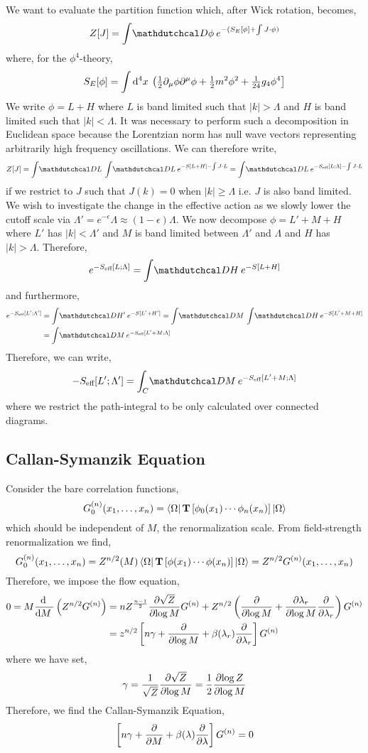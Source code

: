 \documentclass[12pt]{extarticle}
\begin{document}
We want to evaluate the partition function which, after Wick rotation, becomes,
\[ Z[J] = \int \pathd{\phi} e^{-(S_E[\phi] + \int J \cdot \phi)} \]
where, for the $\phi^4$-theory,
\[ S_E[\phi] = \int \mathrm{d}^{4} x \: \left( \tfrac{1}{2} \partial_\mu \phi \partial^\mu \phi + \tfrac{1}{2} m^2 \phi^2 + \tfrac{1}{24} g_4 \phi^4 \right] \]
We write $\phi = L + H$ where $L$ is band limited such that $|k| > \Lambda$ and $H$ is band limited such that $|k| < \Lambda$. It was necessary to perform such a decomposition in Euclidean space because the Lorentzian norm has null wave vectors representing arbitrarily high frequency oscillations. 
We can therefore write,
\[ Z[J] = \int \pathd{L} \int \pathd{L} e^{-S[L + H] - \int J \cdot L}  = \int \pathd{L} e^{- S_{\text{eff}}[L; \Lambda] - \int J \cdot L} \] 
if we restrict to $J$ such that $J(k) = 0$ when $|k| \ge \Lambda$ i.e. $J$ is also band limited. 
\bigskip\\
We wish to investigate the change in the effective action as we slowly lower the cutoff scale via $\Lambda' = e^{-\epsilon} \Lambda \approx (1 - \epsilon) \Lambda$. We now decompose $\phi = L' + M + H$ where $L'$ has $|k| < \Lambda'$ and $M$ is band limited between $\Lambda'$ and $\Lambda$ and $H$ has $|k| > \Lambda$. Therefore,
\[ e^{-S_{\text{eff}}[L; \Lambda]} = \int \pathd{H} e^{-S[L + H]} \] 
and furthermore,
\begin{align*}
e^{-S_{\text{eff}}[L'; \Lambda']} & = \int \pathd{H'} e^{-S[L' + H']} = \int \pathd{M} \int \pathd{H} e^{-S[L' + M + H]}
\\
& = \int \pathd{M} e^{-S_{\text{eff}}[L' + M; \Lambda]}
\end{align*}
Therefore, we can write,
\[ - S_{\text{eff}}[L'; \Lambda'] = \int_{C} \pathd{M} e^{-S_{\text{eff}}[L' + M ; \Lambda] } \]
where we restrict the path-integral to be only calculated over connected diagrams. 

\subsection{Callan-Symanzik Equation}

Consider the bare correlation functions,
\[ G_0^{(n)}(x_1, \dots, x_n) = \left< \Omega \right| \mathbf{T}\left[ \phi_0(x_1) \cdots \phi_n(x_n) \right] \left| \Omega \right> \]
which should be independent of $M$, the renormalization scale. From field-strength renormalization we find,
\[ G_0^{(n)}(x_1, \dots, x_n) = Z^{n/2}(M) \left< \Omega \right| \mathbf{T}\left[ \phi(x_1) \cdots \phi(x_n) \right] \left| \Omega \right> = Z^{n/2} G^{(n)}(x_1, \dots, x_n) \]
Therefore, we impose the flow equation,
\begin{align*}
0 = M \frac{\mathrm{d} \:}{\mathrm{d}M \:} \left( Z^{n/2} G^{(n)} \right) & = n Z^{\frac{n-1}{2}} \frac{\partial{\sqrt{Z}}}{\partial{\log{M}}} G^{(n)} + Z^{n/2} \left( \frac{\partial{}}{\partial{\log{M}}} + \frac{\partial{\lambda_r}}{\partial{\log{M}}} \frac{\partial{}}{\partial{\lambda_r}} \right) G^{(n)} 
\\
& = z^{n/2} \left[ n \gamma + \frac{\partial{}}{\partial{\log{M}}} + \beta(\lambda_r) \frac{\partial{}}{\partial{\lambda_r}} \right] G^{(n)}
\end{align*}
where we have set,
\[ \gamma = \frac{1}{\sqrt{Z}} \frac{\partial{\sqrt{Z}}}{\partial{\log{M}}} = \frac{1}{2} \frac{\partial{\log{Z}}}{\partial{\log{M}}} \]
Therefore, we find the Callan-Symanzik Equation,
\[ \left[ n \gamma + \frac{\partial{}}{\partial{M}} + \beta(\lambda) \frac{\partial{}}{\partial{\lambda}} \right] G^{(n)} = 0 \]
\end{document}
